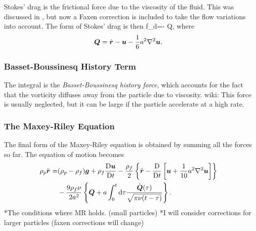 Stokes' drag is the frictional force due to the viscosity of the fluid. This was discussed in , but now a Faxen correction is included to take the flow variations into account. The form of Stokes' drag is then
\beq
\vec f_{d}=- \vec Q,
\eeq
where
\begin{equation}
\boldsymbol{Q} = \dot{\boldsymbol{r}} - \boldsymbol{u}-\frac{1}{6}a^2\nabla^2\boldsymbol{u}.
\end{equation}

\subsubsection{Basset-Boussinesq History Term}

The integral is the \emph{Basset-Boussinesq history force}, which accounts for the fact that the vorticity diffuses away from the particle due to viscosity. wiki: This force is usually neglected, but it can be large if the particle accelerate at a high rate. 


\subsubsection{The Maxey-Riley Equation}
The final form of the Maxey-Riley equation is obtained by summing all the forces so far. The equation of motion becomes
\begin{align}
\rho_p \ddot{\boldsymbol{r}} = &(\rho _p - \rho _f) \boldsymbol{g} + \rho _f 
\frac{\mathrm{D} \boldsymbol{u}}{\mathrm{D} t} - \frac{\rho_f}{2}\left\{\ddot{\boldsymbol{r}} - 
\frac{\mathrm{D}}{\mathrm{D} t}\left[\boldsymbol{u} + \frac{1}{10}a^2\nabla^2 \boldsymbol{u} \right] 
\right\} \nonumber \\ &- \frac{9 \rho _f \nu}{2 a^2}\left\{\boldsymbol{Q} + 
a \int_0^t \mathrm{d} \tau \frac{\dot{\boldsymbol{Q}} (\tau )}{\sqrt{\pi \nu (t-\tau )}}
\right\}.
\end{align}
*The conditions where MR holds. (small particles)
*I will consider corrections for larger particles (faxen corrections will change)
